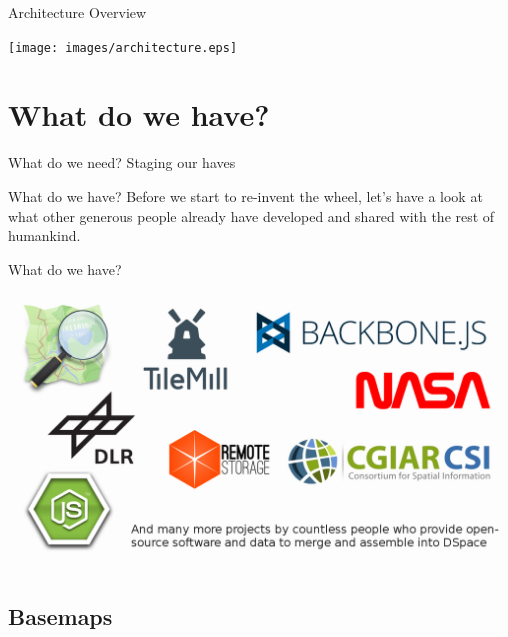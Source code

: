 \documentclass{beamer}
\begin{document}
\begin{frame}{Architecture Overview}
 \begin{center}
  \texttt{[image: images/architecture.eps]}
 \end{center}
\end{frame}



\section{What do we have?}

\begin{frame}{What do we need?}
 Staging our haves
\end{frame}

\begin{frame}{What do we have?}
 Before we start to re-invent the wheel, let's have a look at what other
 generous people already have developed and shared with the rest of humankind.
\end{frame}

\begin{frame}{What do we have?}
 \vspace{0.8em}
 \begin{center}
  \includegraphics[scale=0.281]{images/logos}
 \end{center}
\end{frame}


\subsection{Basemaps}
\end{document}
